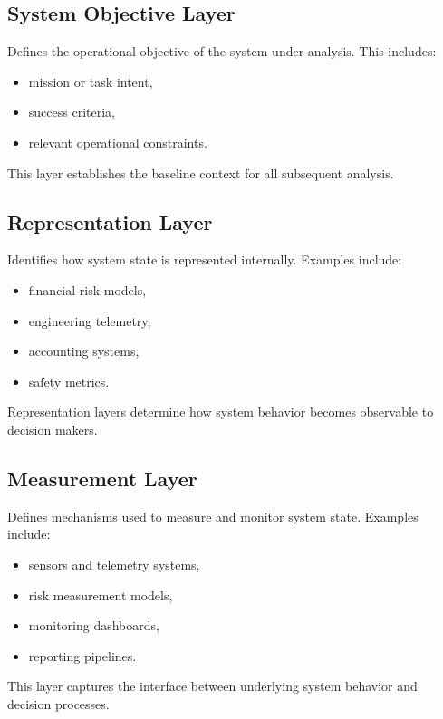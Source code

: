 \subsection{System Objective Layer}

Defines the operational objective of the system under analysis. This includes:

\begin{itemize}
\item mission or task intent,
\item success criteria,
\item relevant operational constraints.
\end{itemize}

This layer establishes the baseline context for all subsequent analysis.

\subsection{Representation Layer}

Identifies how system state is represented internally. Examples include:

\begin{itemize}
\item financial risk models,
\item engineering telemetry,
\item accounting systems,
\item safety metrics.
\end{itemize}

Representation layers determine how system behavior becomes observable to decision makers.

\subsection{Measurement Layer}

Defines mechanisms used to measure and monitor system state. Examples include:

\begin{itemize}
\item sensors and telemetry systems,
\item risk measurement models,
\item monitoring dashboards,
\item reporting pipelines.
\end{itemize}

This layer captures the interface between underlying system behavior and decision processes.

